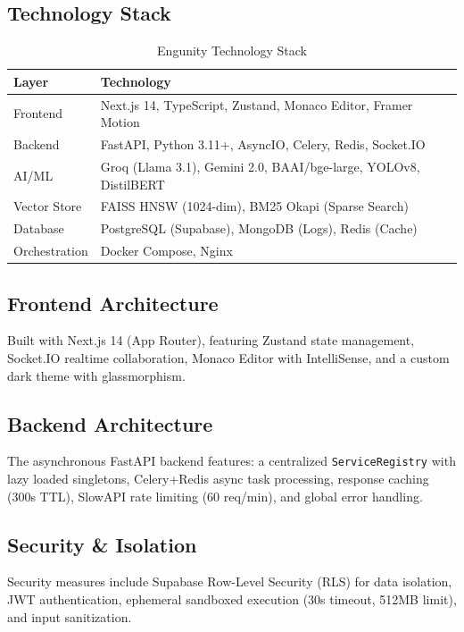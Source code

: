 \documentclass[conference]{IEEEtran}
\begin{document}
\subsection{Technology Stack}

\begin{table}[htbp]
\caption{Engunity Technology Stack}
\begin{center}
\begin{tabularx}{\linewidth}{|l|X|}
\hline
\textbf{Layer} & \textbf{Technology} \\
\hline
Frontend & Next.js 14, TypeScript, Zustand, Monaco Editor, Framer Motion \\
\hline
Backend & FastAPI, Python 3.11+, AsyncIO, Celery, Redis, Socket.IO \\
\hline
AI/ML & Groq (Llama 3.1), Gemini 2.0, BAAI/bge-large, YOLOv8, DistilBERT \\
\hline
Vector Store & FAISS HNSW (1024-dim), BM25 Okapi (Sparse Search) \\
\hline
Database & PostgreSQL (Supabase), MongoDB (Logs), Redis (Cache) \\
\hline
Orchestration & Docker Compose, Nginx \\
\hline
\end{tabularx}
\label{tab:techstack}
\end{center}
\end{table}

\subsection{Frontend Architecture}
Built with Next.js 14 (App Router), featuring Zustand state management, Socket.IO realtime collaboration, Monaco Editor with IntelliSense, and a custom dark theme with glassmorphism.

\subsection{Backend Architecture}
The asynchronous FastAPI backend features: a centralized \texttt{ServiceRegistry} with lazy loaded singletons, Celery+Redis async task processing, response caching (300s TTL), SlowAPI rate limiting (60 req/min), and global error handling.

\subsection{Security \& Isolation}
Security measures include Supabase Row-Level Security (RLS) for data isolation, JWT authentication, ephemeral sandboxed execution (30s timeout, 512MB limit), and input sanitization.
\end{document}
